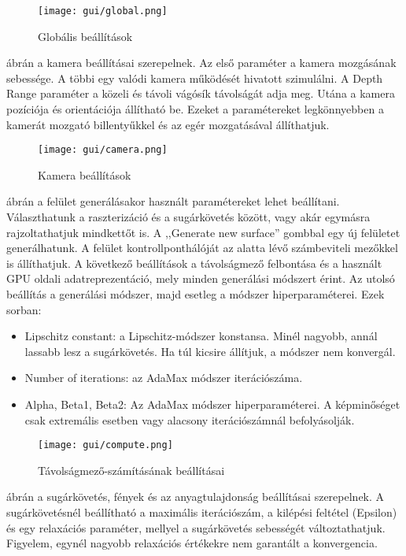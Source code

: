 \begin{figure}[H]
	\centering
	\texttt{[image: gui/global.png]}
	\caption{Globális beállítások}
	\label{fig:global-settings}
\end{figure}

 ábrán a kamera beállításai szerepelnek. Az első paraméter a kamera mozgásának sebessége. A többi egy valódi kamera működését hivatott szimulálni. A Depth Range paraméter a közeli és távoli vágósík távolságát adja meg. Utána a kamera pozíciója és orientációja állítható be. Ezeket a paramétereket legkönnyebben a kamerát mozgató billentyűkkel és az egér mozgatásával állíthatjuk.

\begin{figure}[H]
	\centering
	\texttt{[image: gui/camera.png]}
	\caption{Kamera beállítások}
	\label{fig:camera-settings}
\end{figure}

 ábrán a felület generálásakor használt paramétereket lehet beállítani. Választhatunk a raszterizáció és a sugárkövetés között, vagy akár egymásra rajzoltathatjuk mindkettőt is. A ,,Generate new surface'' gombbal egy új felületet generálhatunk. A felület kontrollponthálóját az alatta lévő számbeviteli mezőkkel is állíthatjuk. A következő beállítások a távolságmező felbontása és a használt GPU oldali adatreprezentáció, mely minden generálási módszert érint. Az utolsó beállítás a generálási módszer, majd esetleg a módszer hiperparaméterei. Ezek sorban:
\begin{itemize}
	\item Lipschitz constant: a Lipschitz-módszer konstansa. Minél nagyobb, annál lassabb lesz a sugárkövetés. Ha túl kicsire állítjuk, a módszer nem konvergál.
	\item Number of iterations: az AdaMax módszer iterációszáma.
	\item Alpha, Beta1, Beta2: Az AdaMax módszer hiperparaméterei. A képminőséget csak extremális esetben vagy alacsony iterációszámnál befolyásolják.
\end{itemize}

\begin{figure}[H]
	\centering
	\texttt{[image: gui/compute.png]}
	\caption{Távolságmező-számításának beállításai}
	\label{fig:compute-settings}
\end{figure}

 ábrán a sugárkövetés, fények és az anyagtulajdonság beállításai szerepelnek. A sugárkövetésnél beállítható a maximális iterációszám, a kilépési feltétel (Epsilon) és egy relaxációs paraméter, mellyel a sugárkövetés sebességét változtathatjuk. Figyelem, egynél nagyobb relaxációs értékekre nem garantált a konvergencia.


